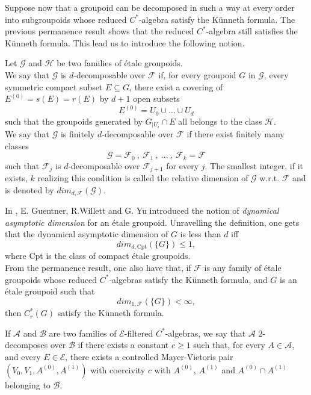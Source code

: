 \begin{frame}
Suppose now that a groupoid can be decomposed in such a way at every order into subgroupoids whose reduced $C^*$-algebra satisfy the Künneth formula. The previous permanence result shows that the reduced $C^*$-algebra still satisfies the Künneth formula. This lead us to introduce the following notion.

\begin{definition}
Let $\mathcal G$ and $\mathcal H$ be two families of \'etale groupoids. \\

We say that $\mathcal G$ is $d$-decomposable over $\mathcal F$ if, for every groupoid $G$ in $\mathcal G$, every symmetric compact subset $E\subseteq G$, there exist a covering of $E^{(0)} = s(E)=r(E)$ by $d+1$ open subsets 
\[E^{(0)} = U_0 \cup ... \cup U_d \] such that the groupoids generated by $G_{|U_i} \cap E$ all belongs to the class $\mathcal H$.\\

We say that $\mathcal G$ is finitely $d$-decomposable over $\mathcal F$ if there exist finitely many classes 
\[\mathcal G= \mathcal F_0 \ , \ \mathcal F_1 \ , \ ... \ , \ \mathcal F_k = \mathcal F \] 
such that $\mathcal F_j$ is $d$-decomposable over $\mathcal F_{j+1}$ for every $j$. The smallest integer, if it exists, $k$ realizing this condition is called the relative dimension of $\mathcal G$ w.r.t. $\mathcal F$ and is denoted by $dim_{d,\mathcal F}(\mathcal G)$.  
\end{definition}

In \cite{GWY}, E. Guentner, R.Willett and G. Yu introduced the notion of \textit{dynamical asymptotic dimension} for an \'etale groupoid. Unravelling the definition, one gets that the dynamical asymptotic dimension of $G$ is less than $d$ iff \[dim_{d,\text{Cpt}} (\{G\}) \leq 1,\]
where Cpt is the class of compact \'etale groupoids.\\

From the permanence result, one also have that, if $\mathcal F$ is any family of \'etale groupoids whose reduced $C^*$-algebras satisfy the Künneth formula, and $G$ is an \'etale groupoid such that \[dim_{1, \mathcal F} ( \{G\} ) < \infty, \]
then $C_r^*(G)$ satisfy the Künneth formula.
\end{frame}
\begin{frame}

\begin{definition}
If $\mathcal A$ and $\mathcal B$ are two families of $\mathcal E$-filtered $C^*$-algebras, we say that $\mathcal A$ $2$-decomposes over $\mathcal B$ if there exists a constant $c\geq 1$ such that, for every $A\in\mathcal A$, and every $E\in \mathcal E$, there exists a controlled Mayer-Vietoris pair $(V_0, V_1, A^{(0)}, A^{(1)})$ with coercivity $c$ with $A^{(0)}$, $A^{(1)}$ and $A^{(0)} \cap A^{(1)}$ belonging to $\mathcal B$.
\end{definition} 
\end{frame}


